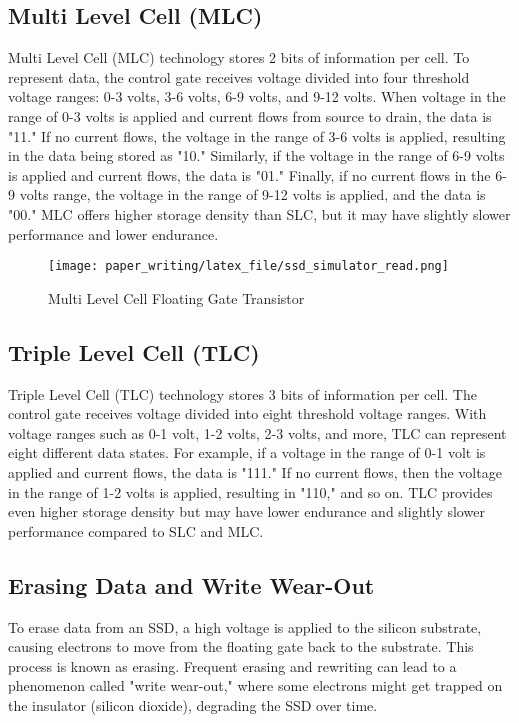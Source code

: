 \documentclass[conference]{/home/habib/Desktop/flash_ssd_simulator_web/paper_writing/latex_file/IEEEtran}
\begin{document}
\subsection{Multi Level Cell (MLC)}
Multi Level Cell (MLC) technology stores 2 bits of information per cell. To represent data, the control gate receives voltage divided into four threshold voltage ranges: 0-3 volts, 3-6 volts, 6-9 volts, and 9-12 volts. When voltage in the range of 0-3 volts is applied and current flows from source to drain, the data is "11." If no current flows, the voltage in the range of 3-6 volts is applied, resulting in the data being stored as "10." Similarly, if the voltage in the range of 6-9 volts is applied and current flows, the data is "01." Finally, if no current flows in the 6-9 volts range, the voltage in the range of 9-12 volts is applied, and the data is "00." MLC offers higher storage density than SLC, but it may have slightly slower performance and lower endurance.
\begin{figure}[h]
    \centering
    \texttt{[image: paper\_writing/latex\_file/ssd\_simulator\_read.png]}
    \caption{Multi Level Cell Floating Gate Transistor}
    \label{fig:ssd_simulator_read}
\end{figure}
\subsection{Triple Level Cell (TLC)}
Triple Level Cell (TLC) technology stores 3 bits of information per cell. The control gate receives voltage divided into eight threshold voltage ranges. With voltage ranges such as 0-1 volt, 1-2 volts, 2-3 volts, and more, TLC can represent eight different data states. For example, if a voltage in the range of 0-1 volt is applied and current flows, the data is "111." If no current flows, then the voltage in the range of 1-2 volts is applied, resulting in "110," and so on. TLC provides even higher storage density but may have lower endurance and slightly slower performance compared to SLC and MLC.

\subsection{Erasing Data and Write Wear-Out}
To erase data from an SSD, a high voltage is applied to the silicon substrate, causing electrons to move from the floating gate back to the substrate. This process is known as erasing. Frequent erasing and rewriting can lead to a phenomenon called "write wear-out," where some electrons might get trapped on the insulator (silicon dioxide), degrading the SSD over time.
\end{document}
